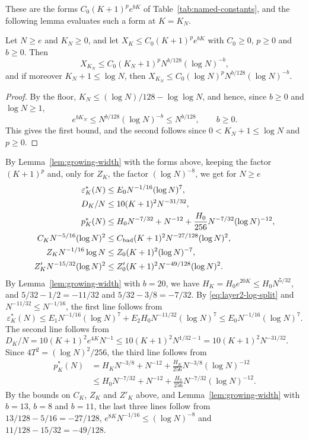 These are the forms $C_0(K+1)^pe^{bK}$ of
Table~\ref{tab:named-constants}, and the following lemma evaluates such
a form at $K=K_N$.

\begin{lemma}\label{lem:growing-width}
Let $N\ge e$ and $K_N\ge0$, and let $X_K\le C_0(K+1)^pe^{bK}$ with
$C_0\ge0$, $p\ge0$ and $b\ge0$. Then
\[
 X_{K_N}\le C_0(K_N+1)^pN^{b/128}(\log N)^{-b},
\]
and if moreover $K_N+1\le\log N$, then
$X_{K_N}\le C_0(\log N)^pN^{b/128}(\log N)^{-b}$.
\end{lemma}

\begin{proof}
By the floor, $K_N\le(\log N)/128-\log\log N$, and hence, since $b\ge0$
and $\log N\ge1$,
\[
 e^{bK_N}\le N^{b/128}(\log N)^{-b}\le N^{b/128},\qquad b\ge0.
\]
This gives the first bound, and the second follows since
$0<K_N+1\le\log N$ and $p\ge0$.
\end{proof}

By Lemma~\ref{lem:growing-width} with the forms above, keeping the
factor $(K+1)^p$ and, only for $Z_K$, the factor $(\log N)^{-8}$, we get
for $N\ge e$
\begin{align}
 \varepsilon_K^*(N)&\le E_0N^{-1/16}(\log N)^7,\nonumber\\
 D_K/N&\le10(K+1)^2N^{-31/32},\nonumber\\
 p_K^*(N)&\le H_0N^{-7/32}+N^{-12}
 +\frac{H_0}{256}N^{-7/32}(\log N)^{-12},\nonumber\\
 C_KN^{-5/16}(\log N)^2
 &\le C_{\rm bad}(K+1)^2N^{-27/128}(\log N)^2,\nonumber\\
 Z_KN^{-1/16}\log N
 &\le Z_0(K+1)^2(\log N)^{-7},\nonumber\\
 Z'_KN^{-15/32}(\log N)^2
 &\le Z'_0(K+1)^2N^{-49/128}(\log N)^2.
                                                        \label{eq:E2-majorants}
\end{align}
By Lemma~\ref{lem:growing-width} with $b=20$, we have
$H_K=H_0e^{20K}\le H_0N^{5/32}$, and $5/32-1/2=-11/32$ and
$5/32-3/8=-7/32$. By \eqref{eq:layer2-log-split} and
$N^{-11/32}\le N^{-1/16}$, the first line follows from
\[
 \varepsilon_K^*(N)
 \le E_1N^{-1/16}(\log N)^7+E_2H_0N^{-11/32}(\log N)^7
 \le E_0N^{-1/16}(\log N)^7.
\]
The second line follows from
$D_K/N=10(K+1)^2e^{4K}N^{-1}\le10(K+1)^2N^{1/32-1}=10(K+1)^2N^{-31/32}$.
Since $4T^2=(\log N)^2/256$, the third line follows from
\begin{align*}
 p_K^*(N)&=H_KN^{-3/8}+N^{-12}
 +\frac{H_K}{256}N^{-3/8}(\log N)^{-12}\\
 &\le H_0N^{-7/32}+N^{-12}
 +\frac{H_0}{256}N^{-7/32}(\log N)^{-12}.
\end{align*}
By the bounds on $C_K$, $Z_K$ and $Z'_K$ above, and
Lemma~\ref{lem:growing-width} with $b=13$, $b=8$ and $b=11$, the last
three lines follow from $13/128-5/16=-27/128$,
$e^{8K}N^{-1/16}\le(\log N)^{-8}$ and $11/128-15/32=-49/128$.


